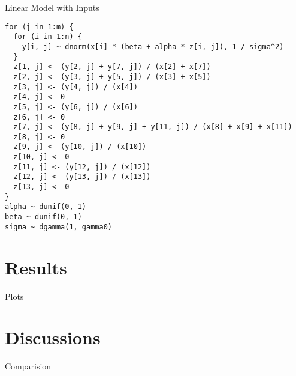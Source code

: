 \documentclass{beamer}
\begin{document}
\begin{frame}[containsverbatim]{Linear Model with Inputs}
\begin{verbatim}
for (j in 1:m) {
  for (i in 1:n) {
    y[i, j] ~ dnorm(x[i] * (beta + alpha * z[i, j]), 1 / sigma^2)
  }
  z[1, j] <- (y[2, j] + y[7, j]) / (x[2] + x[7])
  z[2, j] <- (y[3, j] + y[5, j]) / (x[3] + x[5])
  z[3, j] <- (y[4, j]) / (x[4])
  z[4, j] <- 0
  z[5, j] <- (y[6, j]) / (x[6])
  z[6, j] <- 0
  z[7, j] <- (y[8, j] + y[9, j] + y[11, j]) / (x[8] + x[9] + x[11])
  z[8, j] <- 0
  z[9, j] <- (y[10, j]) / (x[10])
  z[10, j] <- 0
  z[11, j] <- (y[12, j]) / (x[12])
  z[12, j] <- (y[13, j]) / (x[13])
  z[13, j] <- 0
}
alpha ~ dunif(0, 1)
beta ~ dunif(0, 1)
sigma ~ dgamma(1, gamma0)
\end{verbatim}
\end{frame}

\section{Results}

\begin{frame}{Plots}

\end{frame}

\section{Discussions}

\begin{frame}{Comparision}

\end{frame}
\end{document}
